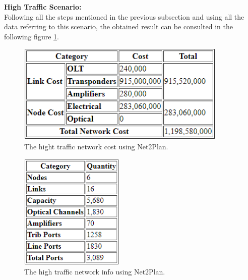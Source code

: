 \newpage
\textbf{High Traffic Scenario:}\\

Following all the steps mentioned in the previous subsection and using all the data referring to this scenario, the obtained result can be consulted in the following figure \ref{High_Network_Cost_Opaque}.

\begin{figure}[h!]
\centering
\includegraphics[width=10cm]{sdf/heuristic/figures/High_Network_Cost_Opaque}
\caption{The hight traffic network cost using Net2Plan.}
\label{High_Network_Cost_Opaque}
\end{figure}

\begin{figure}[h!]
\centering
\includegraphics[width=5cm]{sdf/heuristic/figures/High_Network_Info_Opaque}
\caption{The high traffic network info using Net2Plan.}
\label{High_Network_Info_Opaque}
\end{figure}
